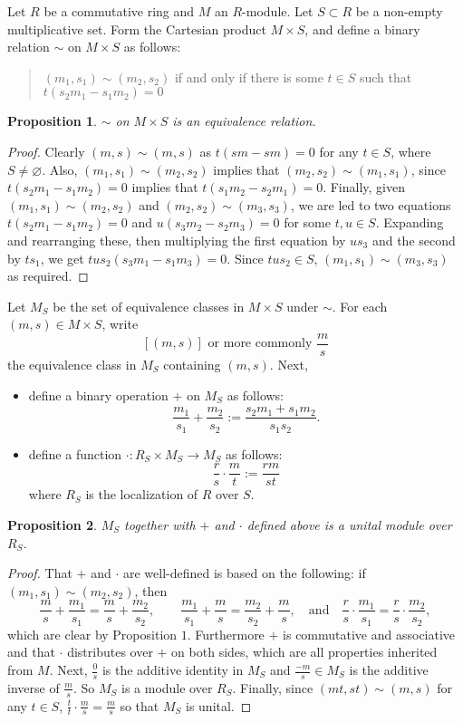 \documentclass[12pt]{article}
\newtheorem{prop}{Proposition}
\begin{document}
Let $R$ be a commutative ring and $M$ an $R$-module.  Let $S\subset R$ be a non-empty multiplicative set.  Form the Cartesian product $M\times S$, and define a binary relation $\sim$ on $M\times S$ as follows: 
\begin{quote}
$(m_1,s_1)\sim (m_2,s_2)$ if and only if  there is some $t\in S$ such that $t(s_2m_1-s_1m_2)=0$
\end{quote}

\begin{prop} $\sim$ on $M\times S$ is an equivalence relation. \end{prop}
\begin{proof}  Clearly $(m,s)\sim (m,s)$ as $t(sm-sm)=0$ for any $t\in S$, where $S\ne \varnothing$.  Also, $(m_1,s_1)\sim (m_2,s_2)$ implies that $(m_2,s_2)\sim (m_1,s_1)$, since $t(s_2m_1-s_1m_2)=0$ implies that $t(s_1m_2-s_2m_1)=0$.  Finally, given $(m_1,s_1)\sim (m_2,s_2)$ and $(m_2,s_2)\sim (m_3,s_3)$, we are led to two equations $t(s_2m_1-s_1m_2)=0$ and $u(s_3m_2-s_2m_3)=0$ for some $t,u\in S$.  Expanding and rearranging these, then multiplying the first equation by $us_3$ and the second by $ts_1$, we get $tus_2(s_3m_1-s_1m_3)=0$.  Since $tus_2\in S$, $(m_1,s_1)\sim (m_3,s_3)$ as required.
\end{proof}

Let $M_S$ be the set of equivalence classes in $M\times S$ under $\sim$.  For each $(m,s)\in M\times S$, write $$[(m,s)]\mbox{ or more commonly }\frac{m}{s}$$ the equivalence class in $M_S$ containing $(m,s)$.  Next, 
\begin{itemize}
\item define a binary operation $+$ on $M_S$ as follows: $$\frac{m_1}{s_1}+\frac{m_2}{s_2}:=\frac{s_2m_1+s_1m_2}{s_1s_2}.$$
\item define a function $\cdot: R_S\times M_S\to M_S$ as follows:
$$\frac{r}{s}\cdot \frac{m}{t}:=\frac{rm}{st}$$
where $R_S$ is the localization of $R$ over $S$.
\end{itemize}

\begin{prop} $M_S$ together with $+$ and $\cdot$ defined above is a unital module over $R_S$. \end{prop}
\begin{proof} That $+$ and $\cdot$ are well-defined is based on the following: if $(m_1,s_1)\sim (m_2,s_2)$, then 
$$\frac{m}{s}+\frac{m_1}{s_1}=\frac{m}{s}+\frac{m_2}{s_2},\qquad \frac{m_1}{s_1}+\frac{m}{s}=\frac{m_2}{s_2}+\frac{m}{s},\quad\mbox{and}\quad \frac{r}{s}\cdot \frac{m_1}{s_1}=\frac{r}{s}\cdot \frac{m_2}{s_2},$$
which are clear by Proposition $1$.  Furthermore $+$ is commutative and associative and that $\cdot$ distributes over $+$ on both sides, which are all properties inherited from $M$.  Next, $\displaystyle{\frac{0}{s}}$ is the additive identity in $M_S$ and $\displaystyle{\frac{-m}{s}}\in M_S$ is the additive inverse of $\displaystyle{\frac{m}{s}}$.  So $M_S$ is a module over $R_S$.  Finally, since $(mt,st)\sim (m,s)$ for any $t\in S$, $\displaystyle{\frac{t}{t}\cdot \frac{m}{s}=\frac{m}{s}}$ so that $M_S$ is unital.  \end{proof}
\end{document}

